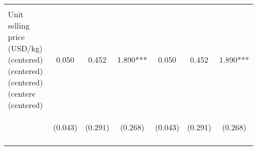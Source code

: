\begin{center}
\begin{tabular}{lcccccc}
\vspace{4pt} & \begin{footnotesize}[0.004]\end{footnotesize} & \begin{footnotesize}[0.000]\end{footnotesize} & \begin{footnotesize}[0.000]\end{footnotesize} & \begin{footnotesize}[0.004]\end{footnotesize} & \begin{footnotesize}[0.000]\end{footnotesize} & \begin{footnotesize}[0.000]\end{footnotesize} \\
Unit selling price (USD/kg) (centered) (centered) (centered) (centere (centered) & 0.050 & 0.452 & 1.890*** & 0.050 & 0.452 & 1.890*** \\
 & \begin{footnotesize}(0.043)\end{footnotesize} & \begin{footnotesize}(0.291)\end{footnotesize} & \begin{footnotesize}(0.268)\end{footnotesize} & \begin{footnotesize}(0.043)\end{footnotesize} & \begin{footnotesize}(0.291)\end{footnotesize} & \begin{footnotesize}(0.268)\end{footnotesize} \\
\vspace{4pt} & \begin{footnotesize}[0.249]\end{footnotesize} & \begin{footnotesize}[0.120]\end{footnotesize} & \begin{footnotesize}[0.000]\end{footnotesize} & \begin{footnotesize}[0.249]\end{footnotesize} & \begin{footnotesize}[0.120]\end{footnotesize} & \begin{footnotesize}[0.000]\end{footnotesize} \\

\end{tabular}
\end{center}
